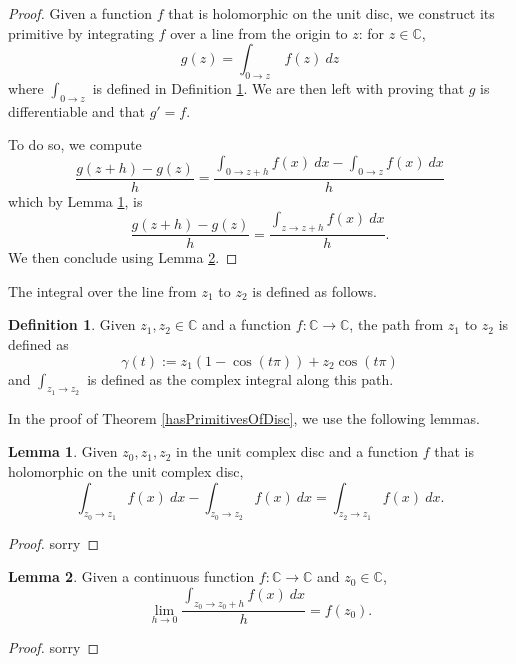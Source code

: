 \documentclass{report}
\theoremstyle{definition}
\newtheorem{definition}{Definition}
\newtheorem{lemma}{Lemma}
\begin{document}
\begin{proof}
  Given a function $f$ that is holomorphic on the unit disc, we construct its primitive by integrating $f$ over a line from the origin to $z$: for $z\in\mathbb C$,
  \begin{equation}
    g(z)=\int_{0\to z}\ f(z)\ dz
  \end{equation}
  where $\int_{0\to z}$ is defined in Definition \ref{linint}.
  We are then left with proving that $g$ is differentiable and that $g'=f$.

  To do so, we compute
  \begin{equation}
    \frac{g(z+h)-g(z)}h
    =
    \frac{\int_{0\to z+h} f(x)\ dx-\int_{0\to z} f(x)\ dx}h
  \end{equation}
  which by Lemma \ref{diffOfIntegrals}, is
  \begin{equation}
    \frac{g(z+h)-g(z)}h
    =
    \frac{\int_{z\to z+h} f(x)\ dx}h
    .
  \end{equation}
  We then conclude using Lemma \ref{derivOfLinint}.
\end{proof}

The integral over the line from $z_1$ to $z_2$ is defined as follows.

\begin{definition}
  \label{linint}
  \leanok
  Given $z_1,z_2\in\mathbb C$ and a function $f:\mathbb C\to\mathbb C$, the path from $z_1$ to $z_2$ is defined as
  \begin{equation}
    \gamma(t):=z_1(1-\cos(t\pi))+z_2\cos(t\pi)
  \end{equation}
  and $\int_{z_1\to z_2}$ is defined as the complex integral along this path.
\end{definition}

In the proof of Theorem \ref{hasPrimitivesOfDisc}, we use the following lemmas.

\begin{lemma}
  \label{diffOfIntegrals}
  \leanok
  Given $z_0,z_1,z_2$ in the unit complex disc and a function $f$ that is holomorphic on the unit complex disc,
  \begin{equation}
    \int_{z_0\to z_1} f(x)\ dx
    -
    \int_{z_0\to z_2} f(x)\ dx
    =
    \int_{z_2\to z_1} f(x)\ dx
    .
  \end{equation}
\end{lemma}

\begin{proof}
  sorry
\end{proof}

\begin{lemma}
  \label{derivOfLinint}
  \leanok
  Given a continuous function $f:\mathbb C\to\mathbb C$ and $z_0\in\mathbb C$,
  \begin{equation}
    \lim_{h\to0}\frac{\int_{z_0\to z_0+h}f(x)\ dx}h=f(z_0)
    .
  \end{equation}
\end{lemma}

\begin{proof}
  sorry
\end{proof}
\end{document}

